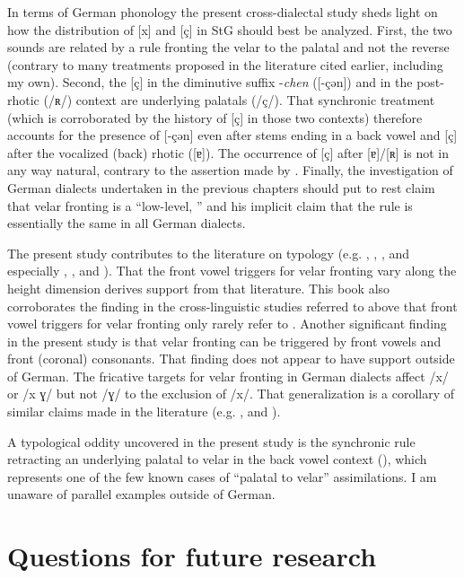 In terms of German phonology the present cross-dialectal study sheds light on how the distribution of [x] and [ç] in StG should best be analyzed. First, the two sounds are related by a rule fronting the velar to the palatal and not the reverse (contrary to many treatments proposed in the literature cited earlier, including my own). Second, the [ç] in the diminutive suffix -\textit{chen} ([-çən]) and in the post-rhotic (/ʀ/) context are underlying palatals (/ç/). That synchronic treatment (which is corroborated by the history of [ç] in those two contexts) therefore accounts for the presence of [-çən] even after stems ending in a back vowel and [ç] after the vocalized (back) rhotic ([ɐ]). The occurrence of [ç] after [ɐ]/[ʀ] is not in any way natural, contrary to the assertion made by \citet{Robinson2001}. Finally, the investigation of German dialects undertaken in the previous chapters should put to rest  claim that velar fronting is a “low-level, ” and his implicit claim that the rule is essentially the same in all German dialects.

The present study contributes to the literature on  typology (e.g. \citealt{Neeld1973}, \citealt{Chen1973}, \citealt{Bhat1978}, and especially \citealt{Bateman2007,Bateman2011,Bateman2007}, \citealt{Kochetov2011}, and \citealt{KrämerUrek2016}). That the front vowel triggers for velar fronting vary along the height dimension derives support from that literature. This book also corroborates the finding in the cross-linguistic studies referred to above that front vowel triggers for velar fronting only rarely refer to . Another significant finding in the present study is that velar fronting can be triggered by front vowels and front (coronal) consonants. That finding does not appear to have support outside of German. The fricative targets for velar fronting in German dialects affect /x/ or /x ɣ/ but not /ɣ/ to the exclusion of /x/. That generalization is a corollary of similar claims made in the literature (e.g. \citealt{Guion1998}, \citealt{HallHamann2006} and \citealt{HallZygis2006}).

A typological oddity uncovered in the present study is the synchronic rule retracting an underlying palatal to velar in the back vowel context (), which represents one of the few known cases of “palatal to velar” assimilations. I am unaware of parallel examples outside of German.

\section{{Questions} {for} {future} {research} }\label{sec:18.5}

